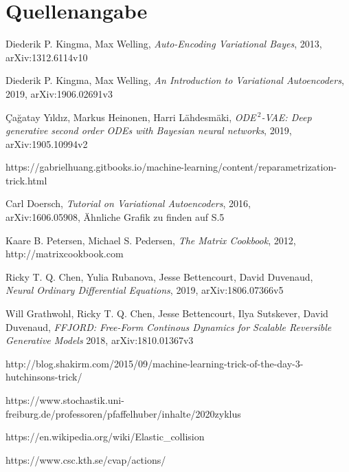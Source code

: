 \documentclass[12pt]{article}
\begin{document}
	\section[Quellenangabe]{Quellenangabe}
	\begin{thebibliography}{9}
		Diederik P. Kingma, Max Welling,
		\textit{Auto-Encoding Variational Bayes},
		2013,\\
		arXiv:1312.6114v10

		Diederik P. Kingma, Max Welling,
		\textit{An Introduction to Variational Autoencoders},
		2019,
		arXiv:1906.02691v3

		Çağatay Yıldız, Markus Heinonen, Harri Lähdesmäki,
		\textit{ODE$^{\ 2}$-VAE: Deep generative second order ODEs with Bayesian neural networks},
		2019,
		arXiv:1905.10994v2

		https://gabrielhuang.gitbooks.io/machine-learning/content/reparametrization-trick.html

		Carl Doersch,
		\textit{Tutorial on Variational Autoencoders},
		2016,\\
		arXiv:1606.05908,
		Ähnliche Grafik zu finden auf S.5

		Kaare B. Petersen, Michael S. Pedersen,
		\textit{The Matrix Cookbook},
		2012,
		http://matrixcookbook.com%

		Ricky T. Q. Chen, Yulia Rubanova, Jesse Bettencourt, David Duvenaud,\\
		\textit{Neural Ordinary Differential Equations},
		2019, arXiv:1806.07366v5

		Will Grathwohl, Ricky T. Q. Chen, Jesse Bettencourt, Ilya Sutskever, David Duvenaud,
		\textit{FFJORD:  Free-Form Continous Dynamics for Scalable Reversible Generative Models}
		2018, arXiv:1810.01367v3

		http://blog.shakirm.com/2015/09/machine-learning-trick-of-the-day-3-hutchinsons-trick/

		https://www.stochastik.uni-freiburg.de/professoren/pfaffelhuber/inhalte/2020zyklus

		https://en.wikipedia.org/wiki/Elastic\_collision

		https://www.csc.kth.se/cvap/actions/
	\end{thebibliography}
\end{document}
